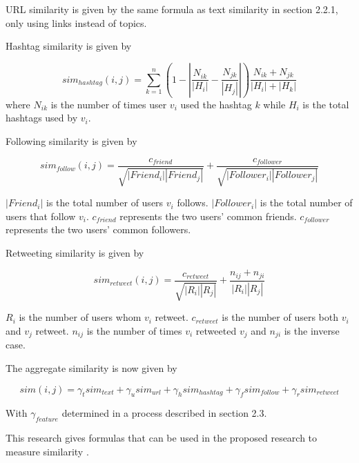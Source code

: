 URL similarity is given by the same formula as text similarity in section 2.2.1, only using links instead of topics.

Hashtag similarity is given by 

\begin{equation}
sim_{hashtag}(i,j) = \sum_{k=1}^n (1 - \left|{\frac{N_{ik}}{\left|{H_i}\right|} - \frac{N_{jk}}{\left|{H_j}\right|}}\right|)\frac{N_{ik} + N_{jk}}{\left|{H_i}\right| + \left|{H_k}\right|}
\end{equation}where $N_{ik}$ is the number of times user $v_i$ used the hashtag $k$ while $H_i$ is the total hashtags used by $v_i$.

Following similarity is given by 

\begin{equation}
sim_{follow}(i,j) = \frac{c_{friend}}{\sqrt{\left|{Friend_i}\right|\left|{Friend_j}\right|}} + \frac{c_{follower}}{\sqrt{\left|{Follower_i}\right|\left|{Follower_j}\right|}}
\end{equation}

$\left|{Friend_i}\right|$ is the total number of users $v_i$ follows. $\left|{Follower_i}\right|$ is the total number of users that follow $v_i$. $c_{friend}$ represents the two users’ common friends. $c_{follower}$ represents the two users’ common followers.

Retweeting similarity is given by 

\begin{equation}
sim_{retweet}(i,j) = \frac{c_{retweet}}{\sqrt{\left|{R_i}\right|\left|{R_j}\right|}} + \frac{n_{ij} + n_{ji}}{\left|{R_i}\right|\left|{R_j}\right|}
\end{equation}

$R_i$ is the number of users whom $v_i$ retweet. $c_{retweet}$ is the number of users both $v_i$ and $v_j$ retweet. $n_{ij}$ is the number of times $v_i$ retweeted $v_j$ and $n_{ji}$ is the inverse case. 

The aggregate similarity is now given by

\begin{equation}
sim(i,j) = \gamma_t sim_{text} + \gamma_u sim_{url} + \gamma_h sim_{hashtag} + \gamma_f sim_{follow} + \gamma_r sim_{retweet}
\end{equation}

With $\gamma_{feature}$ determined in a process described in section 2.3.

This research gives formulas that can be used in the proposed research to measure similarity \cite{Zhang:2012}. 

